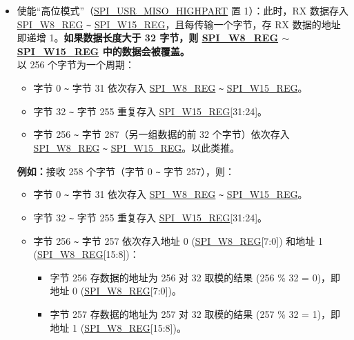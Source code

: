 \documentclass[main\_\_CN.tex]{subfiles}
\begin{document}
\begin{itemize}
\begin{itemize}
        \item 使能“高位模式”（\hyperref[fielddesc:SPIUSRMISOHIGHPART]{SPI\_USR\_MISO\_HIGHPART} 置 1）：此时，RX 数据存入 \hyperref[regdesc:SPIW0REG]{SPI\_W8\_REG} \verb+~+ \hyperref[regdesc:SPIW0REG]{SPI\_W15\_REG}，且每传输一个字节，存 RX 数据的地址即递增 1。\textbf{如果数据长度大于 32 字节，则 \hyperref[regdesc:SPIW0REG]{SPI\_W8\_REG} $\sim$ \hyperref[regdesc:SPIW0REG]{SPI\_W15\_REG} 中的数据会被覆盖。}\\
        以 256 个字节为一个周期：
        \begin{itemize}
            \item 字节 0 \verb+~+ 字节 31 依次存入 \hyperref[regdesc:SPIW0REG]{SPI\_W8\_REG} \verb+~+ \hyperref[regdesc:SPIW0REG]{SPI\_W15\_REG}。
            \item 字节 32 \verb+~+ 字节 255 重复存入 \hyperref[regdesc:SPIW0REG]{SPI\_W15\_REG}[31:24]。
            \item 字节 256 \verb+~+ 字节 287（另一组数据的前 32 个字节）依次存入 \hyperref[regdesc:SPIW0REG]{SPI\_W8\_REG} \verb+~+ \hyperref[regdesc:SPIW0REG]{SPI\_W15\_REG}。以此类推。
        \end{itemize}
        \textbf{例如：}接收 258 个字节（字节 0 \verb+~+ 字节 257），则：
        \begin{itemize}
            \item 字节 0 \verb+~+ 字节 31 依次存入 \hyperref[regdesc:SPIW0REG]{SPI\_W8\_REG} \verb+~+ \hyperref[regdesc:SPIW0REG]{SPI\_W15\_REG}。
            \item 字节 32 \verb+~+ 字节 255 重复存入 \hyperref[regdesc:SPIW0REG]{SPI\_W15\_REG}[31:24]。
            \item 字节 256 \verb+~+ 字节 257 依次存入地址 0 (\hyperref[regdesc:SPIW0REG]{SPI\_W8\_REG}[7:0]) 和地址 1 (\hyperref[regdesc:SPIW0REG]{SPI\_W8\_REG}[15:8])：
            \begin{itemize}
                \item 字节 256 存数据的地址为 256 对 32 取模的结果 (256 \% 32 = 0)，即地址 0 (\hyperref[regdesc:SPIW0REG]{SPI\_W8\_REG}[7:0])。
                \item 字节 257 存数据的地址为 257 对 32 取模的结果 (257 \% 32 = 1)，即地址 1 (\hyperref[regdesc:SPIW0REG]{SPI\_W8\_REG}[15:8])。
            \end{itemize}
        \end{itemize}
    \end{itemize}
\end{itemize}
\end{document}

